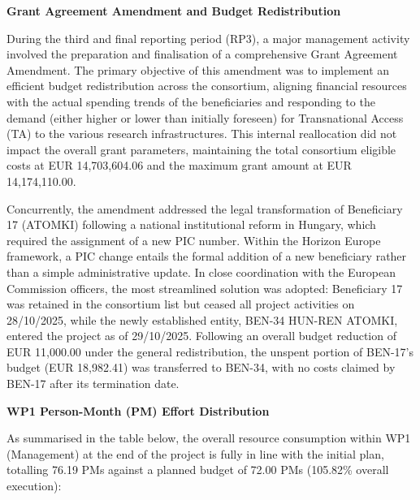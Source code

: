 \noindent\textbf{Grant Agreement Amendment and Budget Redistribution}

During the third and final reporting period (RP3), a major management activity involved the preparation and finalisation of a comprehensive Grant Agreement Amendment. The primary objective of this amendment was to implement an efficient budget redistribution across the consortium, aligning financial resources with the actual spending trends of the beneficiaries and responding to the demand (either higher or lower than initially foreseen) for Transnational Access (TA) to the various research infrastructures. This internal reallocation did not impact the overall grant parameters, maintaining the total consortium eligible costs at EUR 14,703,604.06 and the maximum grant amount at EUR 14,174,110.00.

Concurrently, the amendment addressed the legal transformation of Beneficiary 17 (ATOMKI) following a national institutional reform in Hungary, which required the assignment of a new PIC number. Within the Horizon Europe framework, a PIC change entails the formal addition of a new beneficiary rather than a simple administrative update. In close coordination with the European Commission officers, the most streamlined solution was adopted: Beneficiary 17 was retained in the consortium list but ceased all project activities on 28/10/2025, while the newly established entity, BEN-34 HUN-REN ATOMKI, entered the project as of 29/10/2025. Following an overall budget reduction of EUR 11,000.00 under the general redistribution, the unspent portion of BEN-17's budget (EUR 18,982.41) was transferred to BEN-34, with no costs claimed by BEN-17 after its termination date.

\noindent\textbf{WP1 Person-Month (PM) Effort Distribution}

As summarised in the table below, the overall resource consumption within WP1 (Management) at the end of the project is fully in line with the initial plan, totalling 76.19 PMs against a planned budget of 72.00 PMs (105.82\% overall execution):

